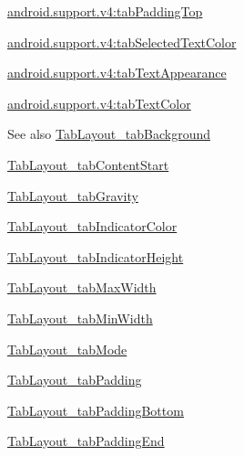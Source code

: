 {\ttfamily \hyperlink{classandroid_1_1support_1_1v4_1_1R_1_1styleable_a5eb6cfc8bb3bdd5e021b1b208a6e4eca}{android.\+support.\+v4\+:tab\+Padding\+Top}}

{\ttfamily \hyperlink{classandroid_1_1support_1_1v4_1_1R_1_1styleable_a1fc04f3779f703c9f532046d056698cd}{android.\+support.\+v4\+:tab\+Selected\+Text\+Color}}

{\ttfamily \hyperlink{classandroid_1_1support_1_1v4_1_1R_1_1styleable_aeacf242f27f0a2963e574087838a660b}{android.\+support.\+v4\+:tab\+Text\+Appearance}}

{\ttfamily \hyperlink{classandroid_1_1support_1_1v4_1_1R_1_1styleable_a3325892a8a8af0369aea2f77e46cdda0}{android.\+support.\+v4\+:tab\+Text\+Color}}

\begin{DoxySeeAlso}{See also}
\hyperlink{classandroid_1_1support_1_1v4_1_1R_1_1styleable_aff73f001a86e4c7bd3a0406f04e2e608}{Tab\+Layout\+\_\+tab\+Background} 

\hyperlink{classandroid_1_1support_1_1v4_1_1R_1_1styleable_a423403a307833c0f1479f98d660ca905}{Tab\+Layout\+\_\+tab\+Content\+Start} 

\hyperlink{classandroid_1_1support_1_1v4_1_1R_1_1styleable_acebed0639553b18aced9e7b66e38ac1d}{Tab\+Layout\+\_\+tab\+Gravity} 

\hyperlink{classandroid_1_1support_1_1v4_1_1R_1_1styleable_ad73a1a29a20855a3bcc60d9bb7acd7b6}{Tab\+Layout\+\_\+tab\+Indicator\+Color} 

\hyperlink{classandroid_1_1support_1_1v4_1_1R_1_1styleable_a11f9245f1247673750bf79b31c3e1832}{Tab\+Layout\+\_\+tab\+Indicator\+Height} 

\hyperlink{classandroid_1_1support_1_1v4_1_1R_1_1styleable_af92579e4d7a148e6a6da15e69617009b}{Tab\+Layout\+\_\+tab\+Max\+Width} 

\hyperlink{classandroid_1_1support_1_1v4_1_1R_1_1styleable_aea0e67b08f61fea507155aa4237dcd59}{Tab\+Layout\+\_\+tab\+Min\+Width} 

\hyperlink{classandroid_1_1support_1_1v4_1_1R_1_1styleable_a7c5dda59a3cd0a09b99263ba97c5f0d0}{Tab\+Layout\+\_\+tab\+Mode} 

\hyperlink{classandroid_1_1support_1_1v4_1_1R_1_1styleable_ad20356f6d901f463b8d5baf3875311a0}{Tab\+Layout\+\_\+tab\+Padding} 

\hyperlink{classandroid_1_1support_1_1v4_1_1R_1_1styleable_a9cf94d20ae7b1d2855d68fb86f6d2af0}{Tab\+Layout\+\_\+tab\+Padding\+Bottom} 

\hyperlink{classandroid_1_1support_1_1v4_1_1R_1_1styleable_a89b79e5b865d6a39d504534559653673}{Tab\+Layout\+\_\+tab\+Padding\+End} 


\end{DoxySeeAlso}
